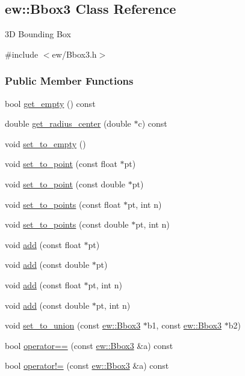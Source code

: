 \hypertarget{classew_1_1Bbox3}{
\subsection{ew::Bbox3 Class Reference}
\label{classew_1_1Bbox3}
}


3D Bounding Box  




{\ttfamily \#include $<$ew/Bbox3.h$>$}

\subsubsection*{Public Member Functions}
\begin{DoxyCompactItemize}
\item 
bool \hyperlink{classew_1_1Bbox3_a26579e1841a0f752e3a79e988e98707f}{get\_\-empty} () const 
\item 
double \hyperlink{classew_1_1Bbox3_a2838343af372447f215625b3bfee011f}{get\_\-radius\_\-center} (double $\ast$c) const 
\item 
void \hyperlink{classew_1_1Bbox3_ab06a8762e69081a2b02a6c1d5b977c6f}{set\_\-to\_\-empty} ()
\item 
void \hyperlink{classew_1_1Bbox3_a53f88220ba9b50c5725a10449bd644b3}{set\_\-to\_\-point} (const float $\ast$pt)
\item 
void \hyperlink{classew_1_1Bbox3_addb0297cecb83b5a86f179546755f34b}{set\_\-to\_\-point} (const double $\ast$pt)
\item 
void \hyperlink{classew_1_1Bbox3_aa7464417fe10edc1620621e2f731efa7}{set\_\-to\_\-points} (const float $\ast$pt, int n)
\item 
void \hyperlink{classew_1_1Bbox3_afb40f89efe08a100f22284b39e5a49e2}{set\_\-to\_\-points} (const double $\ast$pt, int n)
\item 
void \hyperlink{classew_1_1Bbox3_abece0f00bf018e73a26c4673146ff8d6}{add} (const float $\ast$pt)
\item 
void \hyperlink{classew_1_1Bbox3_ab0e8b4e3f0a41986b8dd100882789cde}{add} (const double $\ast$pt)
\item 
void \hyperlink{classew_1_1Bbox3_a56fad10babc1ea138111cf08930610d8}{add} (const float $\ast$pt, int n)
\item 
void \hyperlink{classew_1_1Bbox3_a759091d2ba2a4a8da920655911d32fed}{add} (const double $\ast$pt, int n)
\item 
void \hyperlink{classew_1_1Bbox3_a25fb0f104fa60d5b9e6d1705b2b1cea3}{set\_\-to\_\-union} (const \hyperlink{classew_1_1Bbox3}{ew::Bbox3} $\ast$b1, const \hyperlink{classew_1_1Bbox3}{ew::Bbox3} $\ast$b2)
\item 
bool \hyperlink{classew_1_1Bbox3_a5da873b6427fccb86d76a8080c12f559}{operator==} (const \hyperlink{classew_1_1Bbox3}{ew::Bbox3} \&a) const 
\item 
bool \hyperlink{classew_1_1Bbox3_afc632a5f709054e67d0ab83bee318676}{operator!=} (const \hyperlink{classew_1_1Bbox3}{ew::Bbox3} \&a) const 
\end{DoxyCompactItemize}

